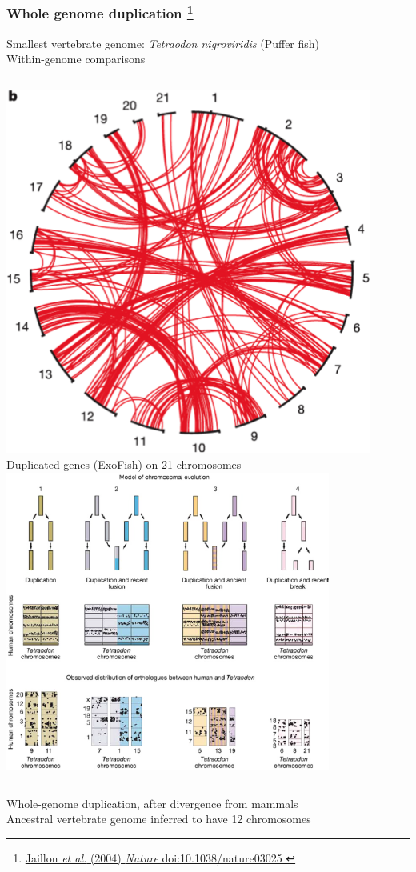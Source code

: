 %
\begin{frame}
  \frametitle{Whole genome duplication
  \footnote{\tiny{\href{http://dx.doi.org/10.1038/nature03025
}{Jaillon \textit{et al.} (2004) \textit{Nature} doi:10.1038/nature03025
}}}
  }
  \textcolor{hutton_green}{Smallest vertebrate genome: \textit{Tetraodon nigroviridis} (Puffer fish)} \\
  Within-genome comparisons
  \begin{columns}[T] 
      \includegraphics[width=0.9\textwidth]{images/exofish_circos} \\
      {\tiny Duplicated genes (ExoFish) on 21 chromosomes}
      \includegraphics[width=0.8\textwidth]{images/exofish_models}
  \end{columns}    
  \textcolor{hutton_green}{Whole-genome duplication, after divergence from mammals} \\
  Ancestral vertebrate genome inferred to have 12 chromosomes
\end{frame}

